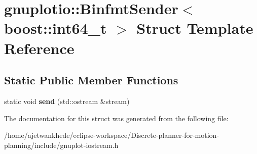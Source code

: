 \hypertarget{structgnuplotio_1_1BinfmtSender_3_01boost_1_1int64__t_01_4}{}\section{gnuplotio\+:\+:Binfmt\+Sender$<$ boost\+:\+:int64\+\_\+t $>$ Struct Template Reference}
\label{structgnuplotio_1_1BinfmtSender_3_01boost_1_1int64__t_01_4}
\subsection*{Static Public Member Functions}
\begin{DoxyCompactItemize}
\item 
\mbox{\label{structgnuplotio_1_1BinfmtSender_3_01boost_1_1int64__t_01_4_a57423f02a4526e15d7d821606b1c8c81}} 
static void {\bfseries send} (std\+::ostream \&stream)
\end{DoxyCompactItemize}


The documentation for this struct was generated from the following file\+:\begin{DoxyCompactItemize}
\item 
/home/ajetwankhede/eclipse-\/workspace/\+Discrete-\/planner-\/for-\/motion-\/planning/include/gnuplot-\/iostream.\+h\end{DoxyCompactItemize}
